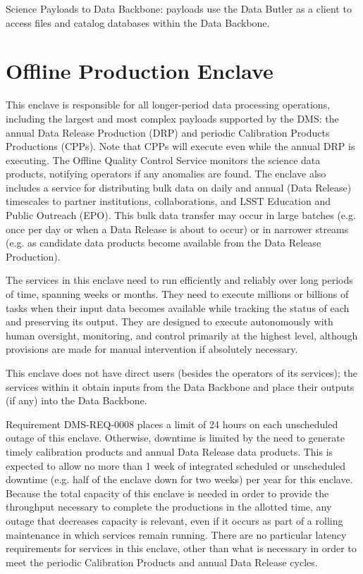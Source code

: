 \documentclass[DM,toc]{lsstdoc}
\begin{document}
Science Payloads to Data Backbone: payloads use the Data Butler as a
client to access files and catalog databases within the Data Backbone.

\section{Offline Production Enclave}\label{offline-production-enclave}

This enclave is responsible for all longer-period data processing
operations, including the largest and most complex payloads supported by
the DMS: the annual Data Release Production (DRP) and periodic
Calibration Products Productions (CPPs). Note that CPPs will execute
even while the annual DRP is executing.
The Offline Quality Control Service monitors the science data
products, notifying operators if any anomalies are found.
The enclave also includes a service for distributing bulk data on daily and annual (Data Release) timescales to partner institutions, collaborations, and LSST Education and Public Outreach (EPO).
This bulk data transfer may occur in large batches (e.g. once per day or when a Data Release is about to occur) or in narrower streams (e.g. as candidate data products become available from the Data Release Production).

The services in this enclave need to run efficiently and reliably over
long periods of time, spanning weeks or months. They need to execute
millions or billions of tasks when their input data becomes available
while tracking the status of each and preserving its output. They are
designed to execute autonomously with human oversight, monitoring, and
control primarily at the highest level, although provisions are made for
manual intervention if absolutely necessary.

This enclave does not have direct users (besides the operators of its
services); the services within it obtain inputs from the Data Backbone
and place their outputs (if any) into the Data Backbone.

Requirement DMS-REQ-0008 places a limit of 24 hours on each unscheduled outage of this enclave.
Otherwise, downtime is limited by the need to generate timely calibration products and annual Data Release data products.
This is expected to allow no more than 1 week of integrated scheduled or unscheduled downtime (e.g. half of the enclave down for two weeks) per year for this enclave.
Because the total capacity of this enclave is needed in order to provide the throughput necessary to complete the productions in the allotted time, any outage that decreases capacity is relevant, even if it occurs as part of a rolling maintenance in which services remain running.
There are no particular latency requirements for services in this enclave, other than what is necessary in order to meet the periodic Calibration Products and annual Data Release cycles.
\end{document}
